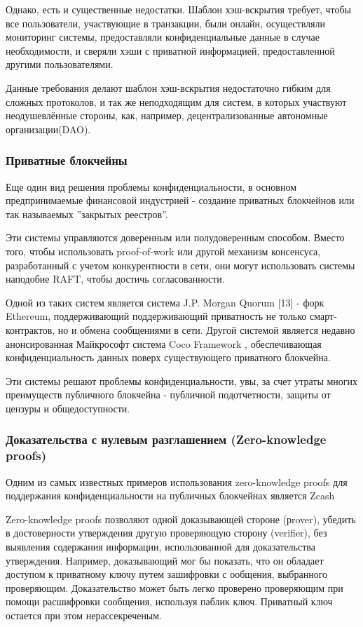 \documentclass[11pt]{article}
\begin{document}
 Однако, есть и существенные недостатки. Шаблон хэш-вскрытия требует, 
 чтобы все пользователи, участвующие в транзакции, были онлайн, 
 осуществляли мониторинг системы, предоставляли конфиденциальные 
 данные в случае необходимости, и сверяли хэши с приватной информацией, 
 предоставленной другими пользователями.

Данные требования делают шаблон хэш-вскрытия недостаточно гибким для 
сложных протоколов, и так же неподходящим для систем, в которых 
участвуют неодушевлённые  стороны, как, например, децентрализованные 
автономные организации(DAO).

\subsubsection{Приватные блокчейны}

Еще один вид решения проблемы конфиденциальности, в основном 
предпринимаемые финансовой индустрией - создание приватных блокчейнов 
или так называемых ”закрытых реестров”.

Эти системы управляются доверенным или полудоверенным способом. Вместо 
того, чтобы использовать proof-of-work или другой механизм консенсуса, 
разработанный с учетом конкурентности в сети, они могут использовать 
системы наподобие RAFT, чтобы достичь согласованности.

Одной из таких систем является система J.P. Morgan Quorum [13] - форк 
Ethereum, поддерживающий поддерживающий приватность не только 
смарт-контрактов, но и обмена сообщениями в сети. Другой системой 
является недавно анонсированная Майкрософт система Coco Framework \cite{coco}, 
обеспечивающая конфиденциальность данных поверх существующего 
приватного блокчейна.

Эти системы решают проблемы конфиденциальности, увы, за счет утраты 
многих преимуществ публичного блокчейна - публичной подотчетности, 
защиты от цензуры и общедоступности. 

\subsubsection{Доказательства с нулевым разглашением (Zero-knowledge proofs)}

Одним из самых известных примеров использования zero-knowledge proofs 
для поддержания конфиденциальности на публичных блокчейнах является Zcash \cite{zcash} 

Zero-knowledge proofs позволяют одной доказывающей стороне (рrover), 
убедить в достоверности утверждения другую проверяющую сторону 
(verifier), без выявления содержания информации, использованной для 
доказательства утверждения. Например, доказывающий мог бы показать,
что он обладает доступом к приватному ключу путем зашифровки с
ообщения, выбранного проверяющим. Доказательство может быть легко 
проверено проверяющим при помощи расшифровки сообщения, используя 
паблик ключ. Приватный ключ остается при этом нерассекреченым.
\end{document}
